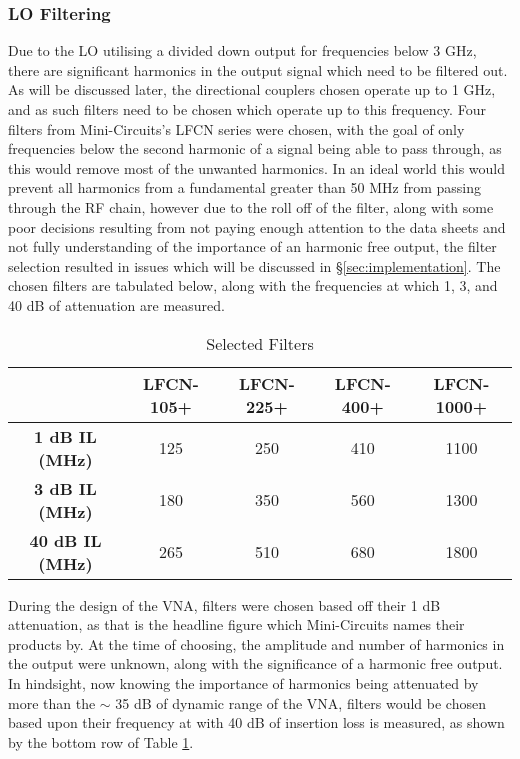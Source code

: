 \subsubsection{LO Filtering}
Due to the LO utilising a divided down output for frequencies below 3 GHz, there are significant harmonics in the output signal which need to be filtered out. As will be discussed later, the directional couplers chosen operate up to 1 GHz, and as such filters need to be chosen which operate up to this frequency. Four filters from Mini-Circuits's LFCN series were chosen, with the goal of only frequencies below the second harmonic of a signal being able to pass through, as this would remove most of the unwanted harmonics. In an ideal world this would prevent all harmonics from a fundamental greater than 50 MHz from passing through the RF chain,  however due to the roll off of the filter, along with some poor decisions resulting from not paying enough attention to the data sheets and not fully understanding of the importance of an harmonic free output, the filter selection resulted in issues which will be discussed in \S \ref{sec:implementation}. The chosen filters are tabulated below, along with the frequencies at which 1, 3, and 40 dB of attenuation are measured. 

\begin{table}[H]
	\caption{Selected Filters}
	\label{table:selected_filters}
	\centering
	\begin{tabular}{|c|c|c|c|c|}
		\hline
		\textbf{}               & \textbf{LFCN-105+} & \textbf{LFCN-225+} & \textbf{LFCN-400+} & \textbf{LFCN-1000+} \\ \hline
		\textbf{1 dB IL (MHz)}  & 125                & 250                & 410                & 1100                \\ \hline
		\textbf{3 dB IL (MHz)}  & 180                & 350                & 560                & 1300                \\ \hline
		\textbf{40 dB IL (MHz)} & 265                & 510                & 680                & 1800                \\ \hline
	\end{tabular}
\end{table}

During the design of the VNA, filters were chosen based off their 1 dB attenuation, as that is the headline figure which Mini-Circuits names their products by. At the time of choosing, the amplitude and number of harmonics in the output were unknown, along with the significance of a harmonic free output. In hindsight, now knowing the importance of harmonics being attenuated by more than the $\sim$ 35 dB of dynamic range of the VNA, filters would be chosen based upon their frequency at with 40 dB of insertion loss is measured, as shown by the bottom row of Table \ref{table:selected_filters}. 

